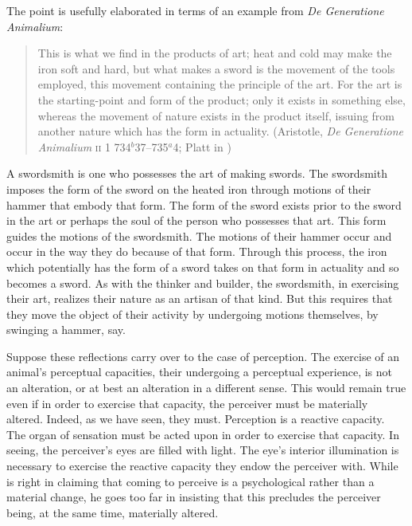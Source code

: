 The point is usefully elaborated in terms of an example from \emph{De Generatione Animalium}:
\begin{quote}
	This is what we find in the products of art; heat and cold may make the iron soft and hard, but what makes a sword is the movement of the tools employed, this movement containing the principle of the art. For the art is the starting-point and form of the product; only it exists in something else, whereas the movement of nature exists in the product itself, issuing from another nature which has the form in actuality. (Aristotle, \emph{De Generatione Animalium} \textsc{ii} 1 734\( ^{b} \)37--735\( ^{a} \)4; Platt in \citealt[38]{Barnes:1984uq})
\end{quote}
A swordsmith is one who possesses the art of making swords. The swordsmith imposes the form of the sword on the heated iron through motions of their hammer that embody that form. The form of the sword exists prior to the sword in the art or perhaps the soul of the person who possesses that art. This form guides the motions of the swordsmith. The motions of their hammer occur and occur in the way they do because of that form. Through this process, the iron which potentially has the form of a sword takes on that form in actuality and so becomes a sword. As with the thinker and builder, the swordsmith, in exercising their art, realizes their nature as an artisan of that kind. But this requires that they move the object of their activity by undergoing motions themselves, by swinging a hammer, say. 

Suppose these reflections carry over to the case of perception. The exercise of an animal's perceptual capacities, their undergoing a perceptual experience, is not an alteration, or at best an alteration in a different sense. This would remain true even if in order to exercise that capacity, the perceiver must be materially altered. Indeed, as we have seen, they must. Perception is a reactive capacity. The organ of sensation must be acted upon in order to exercise that capacity. In seeing, the perceiver's eyes are filled with light. The eye's interior illumination is necessary to exercise the reactive capacity they endow the perceiver with. While \citet{Burnyeat:1992fk} is right in claiming that coming to perceive is a psychological rather than a material change, he goes too far in insisting that this precludes the perceiver being, at the same time, materially altered.

